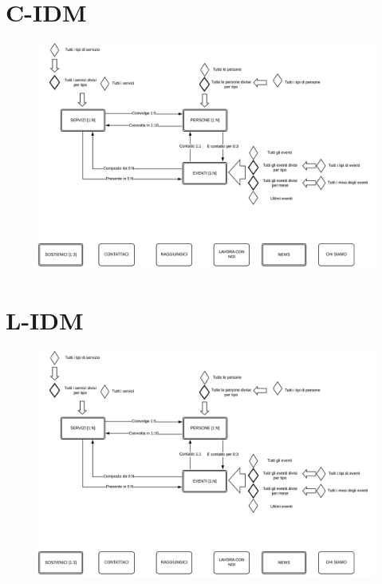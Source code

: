     \section{C-IDM} 
    \begin{figure}[H]
        \centering
        \includegraphics[scale=0.6]{resources/images/c-idm.png}
    \end{figure}
    \section{L-IDM}
    \begin{figure}[H]
        \centering
        \includegraphics[scale=0.6]{resources/images/c-idm.png}
    \end{figure}

